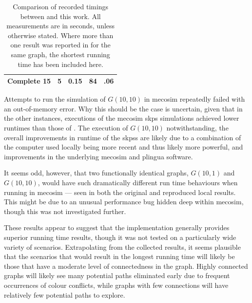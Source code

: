 \begin{table}
\begin{tabular}{@{}lcccc@{}}
Complete 15 & 5                                                            & 0.15                                                           & 84   & .06                                                       \\ \bottomrule
\end{tabular}%
\caption[Comparison of recorded timings between \cite{Gheorghe2013} and this work]{Comparison of recorded timings between \cite{Gheorghe2013} and this work.  All measurements are in seconds, unless otherwise stated.  Where more than one result was reported in \cite{Gheorghe2013} for the same graph, the shortest running time has been included here.}
\label{tab:gcol:timings}
\end{table}

Attempts to run the simulation of \(G(10,10)\) in \gls{mecosim} repeatedly failed with an out-of-memory error.  Why this should be the case is uncertain, given that in the other instances, executions of the \gls{mecosim} \gls{skps} simulations achieved lower runtimes than those of \cite{Gheorghe2013}.  The execution of \(G(10,10)\) notwithstanding, the overall improvements in runtime of the \glspl{skps} are likely due to a combination of the computer used locally being more recent and thus likely more powerful, and improvements in the underlying \gls{mecosim} and \gls{plingua} software.

It seems odd, however, that two functionally identical graphs, \(G(10,1)\) and \(G(10,10)\), would have such dramatically different run time behaviours when running in \gls{mecosim} --- seen in both the original and reproduced local results.  This might be due to an unusual performance bug hidden deep within \gls{mecosim}, though this was not investigated further.

These results appear to suggest that the \fsharp{} implementation generally provides superior running time results, though it was not tested on a particularly wide variety of scenarios.  Extrapolating from the collected results, it seems plausible that the scenarios that would result in the longest running time will likely be those that have a moderate level of connectedness in the graph.  Highly connected graphs will likely see many potential paths eliminated early due to frequent occurrences of colour conflicts, while graphs with few connections will have relatively few potential paths to explore.


